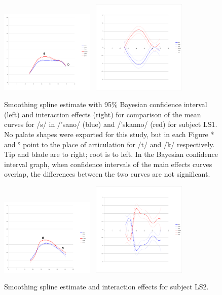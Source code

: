 \documentclass[output=paper]{LSP/langsci}
\begin{document}
\begin{figure}  
\includegraphics[width=0.4\textwidth]{illustrations/sprea_fig1a}~
\includegraphics[width=0.4\textwidth]{illustrations/sprea_fig1b}
\label{fig:1ab}   
\caption{Smoothing spline estimate with 95\% Bayesian confidence interval (left) and interaction effects (right) for comparison of the mean curves for /s/ in /'sano/ (blue) and /'skanno/ (red) for subject LS1. No palate shapes were exported for this study, but in each Figure * and ° point to the place of articulation for /t/ and /k/ respectively. Tip and blade are to right; root is to left. In the Bayesian confidence interval graph, when confidence intervals of the main effects curves overlap, the differences between the two curves are not significant.}
\end{figure}

\begin{figure}
\includegraphics[width=0.4\textwidth]{illustrations/sprea_fig2a}~
\includegraphics[width=0.4\textwidth]{illustrations/sprea_fig2b}
\label{fig:2}   
\caption{Smoothing spline estimate and interaction effects for subject LS2.}
\end{figure}
\end{document}
